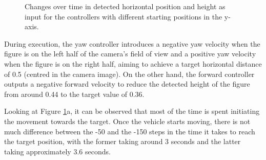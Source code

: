 \begin{figure}[H]
  \centering
  \caption{Changes over time in detected horizontal position and height as input for the controllers with different starting positions in the y-axis.}
  \label{fig:validate-yaw}
\end{figure}

During execution, the yaw controller introduces a negative yaw velocity when the figure is on the left half of the camera's field of view and a positive yaw velocity when the figure is on the right half, aiming to achieve a target horizontal distance of 0.5 (centred in the camera image). On the other hand, the forward controller outputs a negative forward velocity to reduce the detected height of the figure from around 0.44 to the target value of 0.36.

Looking at Figure \ref{fig:validate-yaw}a, it can be observed that most of the time is spent initiating the movement towards the target. Once the vehicle starts moving, there is not much difference between the -50 and the -150 steps in the time it takes to reach the target position, with the former taking around 3 seconds and the latter taking approximately 3.6 seconds. 

